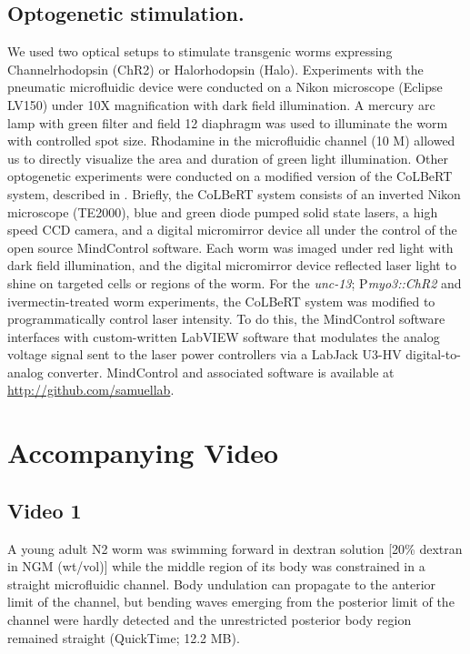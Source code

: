 \subsection{Optogenetic stimulation.}
 We used two optical setups to stimulate transgenic worms expressing 
Channelrhodopsin (ChR2) or Halorhodopsin (Halo). Experiments with the pneumatic 
microfluidic device were conducted on a Nikon microscope (Eclipse LV150) under 10X 
magnification with dark field illumination. A mercury arc lamp with green filter and field 
 12
diaphragm was used to illuminate the worm with controlled spot size. Rhodamine in the 
microfluidic channel (10 \textmu M) allowed us to directly visualize the area and duration of green light 
illumination. 
Other optogenetic experiments were conducted on a modified version of the CoLBeRT system, 
described in \citep{leifer_optogenetic_2011}. Briefly, the CoLBeRT system consists of an inverted Nikon microscope 
(TE2000), blue and green diode pumped solid state lasers, a high speed CCD camera, and a 
digital micromirror device all under the control of the open source MindControl software. Each worm 
was imaged under red light with dark field illumination, and the digital micromirror device 
reflected laser light to shine on targeted cells or regions of the worm. For the \textit{unc-13}; 
P\textit{myo3::ChR2} and ivermectin-treated worm experiments, the CoLBeRT system was modified to 
programmatically control laser intensity. To do this, the MindControl software interfaces with 
custom-written LabVIEW software that modulates the analog voltage signal sent to the laser 
power controllers via a LabJack U3-HV digital-to-analog converter. MindControl and associated software is available at \url{http://github.com/samuellab}.  

\section{Accompanying Video}
\subsection{Video 1}\label{video:prop1}
 
A young adult N2 worm was swimming forward in dextran solution [20\% dextran in NGM 
(wt/vol)] while the middle region of its body was constrained in a straight microfluidic channel. 
Body undulation can propagate to the anterior limit of the channel, but bending waves emerging 
from the posterior limit of the channel were hardly detected and the unrestricted posterior body 
region remained straight (QuickTime; 12.2 MB). 
 
